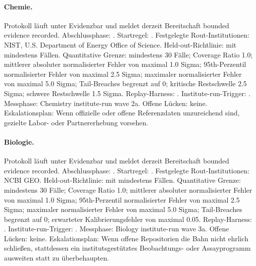 \paragraph{Chemie.}
Protokoll  läuft unter Evidenzbar  und meldet derzeit Bereitschaft bounded evidence recorded.
Abschlussphase: . Startregel: .
Festgelegte Rout-Institutionen: NIST, \allowbreak U.S. Department of Energy Office of Science.
Held-out-Richtlinie:  mit mindestens  Fällen.
Quantitative Grenze: mindestens 30 Fälle; Coverage Ratio 1.0; mittlerer absoluter normalisierter Fehler von maximal 1.0 Sigma; 95th-Perzentil normalisierter Fehler von maximal 2.5 Sigma; maximaler normalisierter Fehler von maximal 5.0 Sigma; Tail-Breaches begrenzt auf 0; kritische Restschwelle 2.5 Sigma; schwere Restschwelle 1.5 Sigma.
Replay-Harness: .
Institute-run-Trigger: . Messphase: Chemistry institute-run wave 2a.
Offene Lücken: keine.
Eskalationsplan: Wenn offizielle oder offene Referenzdaten unzureichend sind, gezielte Labor- oder Partnererhebung vorsehen.

\paragraph{Biologie.}
Protokoll  läuft unter Evidenzbar  und meldet derzeit Bereitschaft bounded evidence recorded.
Abschlussphase: . Startregel: .
Festgelegte Rout-Institutionen: NCBI GEO.
Held-out-Richtlinie:  mit mindestens  Fällen.
Quantitative Grenze: mindestens 30 Fälle; Coverage Ratio 1.0; mittlerer absoluter normalisierter Fehler von maximal 1.0 Sigma; 95th-Perzentil normalisierter Fehler von maximal 2.5 Sigma; maximaler normalisierter Fehler von maximal 5.0 Sigma; Tail-Breaches begrenzt auf 0; erwarteter Kalibrierungsfehler von maximal 0.05.
Replay-Harness: .
Institute-run-Trigger: . Messphase: Biology institute-run wave 3a.
Offene Lücken: keine.
Eskalationsplan: Wenn offene Repositorien die Bahn nicht ehrlich schließen, stattdessen ein institutsgestütztes Beobachtungs- oder Assayprogramm ausweiten statt zu überbehaupten.

